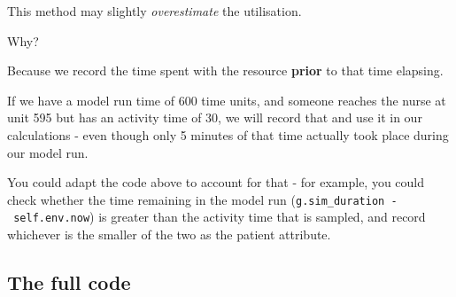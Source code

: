 \documentclass[
  letterpaper,
  DIV=11,
  numbers=noendperiod]{scrreprt}
\begin{document}
\begin{tcolorbox}[enhanced jigsaw, colframe=quarto-callout-important-color-frame, bottomtitle=1mm, breakable, rightrule=.15mm, coltitle=black, colbacktitle=quarto-callout-important-color!10!white, opacityback=0, leftrule=.75mm, arc=.35mm, toptitle=1mm, title=\textcolor{quarto-callout-important-color}{\faExclamation}\hspace{0.5em}{Important}, titlerule=0mm, colback=white, toprule=.15mm, bottomrule=.15mm, left=2mm, opacitybacktitle=0.6]

This method may slightly \emph{overestimate} the utilisation.

Why?

Because we record the time spent with the resource \textbf{prior} to
that time elapsing.

If we have a model run time of 600 time units, and someone reaches the
nurse at unit 595 but has an activity time of 30, we will record that
and use it in our calculations - even though only 5 minutes of that time
actually took place during our model run.

You could adapt the code above to account for that - for example, you
could check whether the time remaining in the model run
(\texttt{g.sim\_duration\ -\ self.env.now}) is greater than the activity
time that is sampled, and record whichever is the smaller of the two as
the patient attribute.

\end{tcolorbox}

\subsection{The full code}\label{the-full-code-7}
\end{document}

